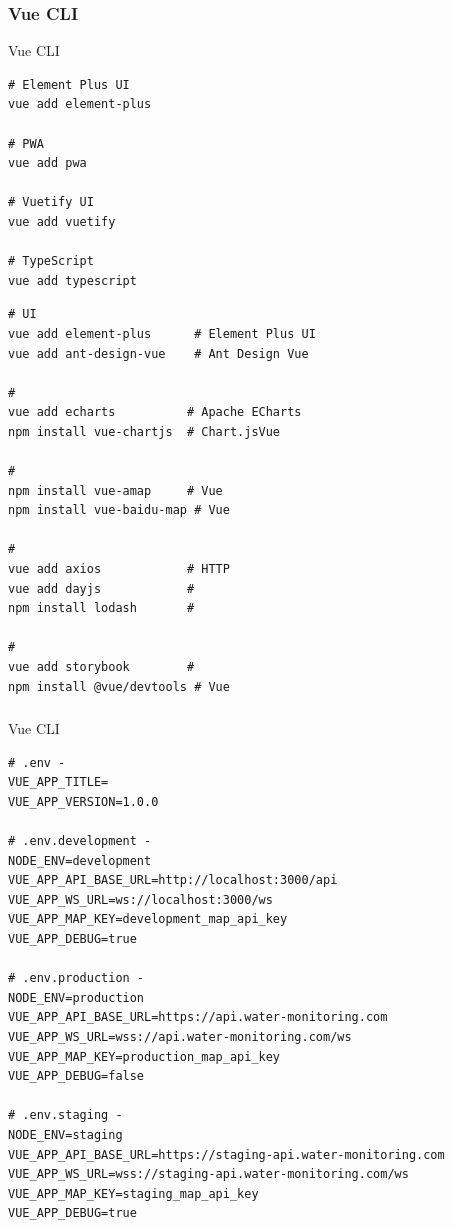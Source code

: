 \hypertarget{vue-cli-4}{%
\subsubsection{Vue CLI}\label{vue-cli-4}}

Vue CLI

\important{}

\begin{lstlisting}[style=terminal]
# Element Plus UI
vue add element-plus

# PWA
vue add pwa

# Vuetify UI
vue add vuetify

# TypeScript
vue add typescript
\end{lstlisting}

\important{}

\begin{lstlisting}[style=terminal]
# UI
vue add element-plus      # Element Plus UI
vue add ant-design-vue    # Ant Design Vue

# 
vue add echarts          # Apache ECharts
npm install vue-chartjs  # Chart.jsVue

# 
npm install vue-amap     # Vue
npm install vue-baidu-map # Vue

# 
vue add axios            # HTTP
vue add dayjs            # 
npm install lodash       # 

# 
vue add storybook        # 
npm install @vue/devtools # Vue
\end{lstlisting}

\hypertarget{section-37}{%
\subsubsection{}\label{section-37}}

Vue CLI


\begin{lstlisting}[style=terminal]
# .env - 
VUE_APP_TITLE=
VUE_APP_VERSION=1.0.0

# .env.development - 
NODE_ENV=development
VUE_APP_API_BASE_URL=http://localhost:3000/api
VUE_APP_WS_URL=ws://localhost:3000/ws
VUE_APP_MAP_KEY=development_map_api_key
VUE_APP_DEBUG=true

# .env.production - 
NODE_ENV=production
VUE_APP_API_BASE_URL=https://api.water-monitoring.com
VUE_APP_WS_URL=wss://api.water-monitoring.com/ws
VUE_APP_MAP_KEY=production_map_api_key
VUE_APP_DEBUG=false

# .env.staging - 
NODE_ENV=staging
VUE_APP_API_BASE_URL=https://staging-api.water-monitoring.com
VUE_APP_WS_URL=wss://staging-api.water-monitoring.com/ws
VUE_APP_MAP_KEY=staging_map_api_key
VUE_APP_DEBUG=true
\end{lstlisting}

